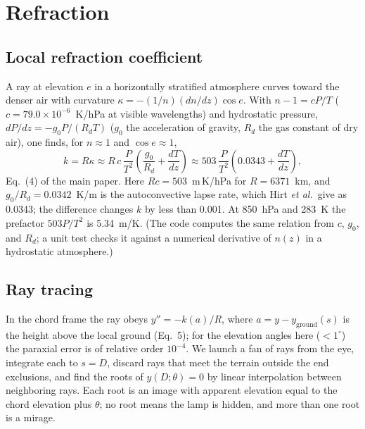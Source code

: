 \documentclass[11pt]{article}
\begin{document}
\section{Refraction}\label{s:refraction}

\subsection{Local refraction coefficient}

A ray at elevation $e$ in a horizontally stratified atmosphere curves toward the denser air with curvature $\kappa=-(1/n)(dn/dz)\cos e$. With $n-1=cP/T$ ($c=79.0\times10^{-6}$~K/hPa at visible wavelengths) and hydrostatic pressure, $dP/dz=-g_0P/(R_dT)$ ($g_0$ the acceleration of gravity, $R_d$ the gas constant of dry air), one finds, for $n\approx1$ and $\cos e\approx1$,
\begin{equation}
k=R\kappa \approx R\,c\,\frac{P}{T^2}\left(\frac{g_0}{R_d}+\frac{dT}{dz}\right)\approx503\,\frac{P}{T^2}\left(0.0343+\frac{dT}{dz}\right),
\end{equation}
Eq.~(4) of the main paper.\cite{Hirt2010} Here $Rc=503$~m\,K/hPa for $R=6371$~km, and $g_0/R_d=0.0342$~K/m is the autoconvective lapse rate, which Hirt \textit{et al.}\ give as 0.0343; the difference changes $k$ by less than 0.001. At 850~hPa and 283~K the prefactor $503P/T^2$ is 5.34~m/K. (The code computes the same relation from $c$, $g_0$, and $R_d$; a unit test checks it against a numerical derivative of $n(z)$ in a hydrostatic atmosphere.)

\subsection{Ray tracing}

In the chord frame the ray obeys $y''=-k(a)/R$, where $a=y-y_{\mathrm{ground}}(s)$ is the height above the local ground (Eq.~5); for the elevation angles here ($<1^\circ$) the paraxial error is of relative order $10^{-4}$. We launch a fan of rays from the eye, integrate each to $s=D$, discard rays that meet the terrain outside the end exclusions, and find the roots of $y(D;\theta)=0$ by linear interpolation between neighboring rays. Each root is an image with apparent elevation equal to the chord elevation plus $\theta$; no root means the lamp is hidden, and more than one root is a mirage.
\end{document}
